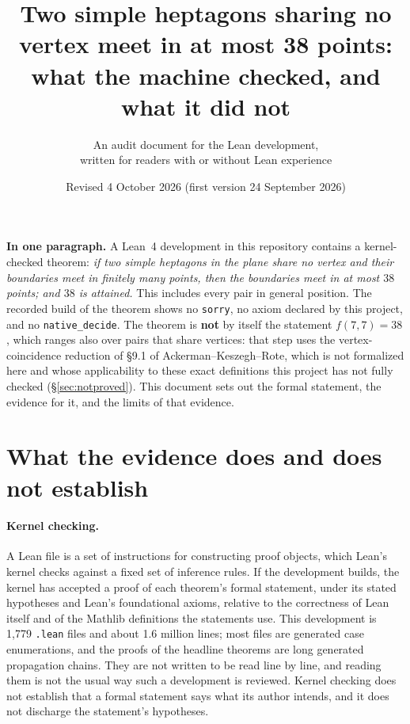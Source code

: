 \documentclass[11pt]{article}
\title{\bfseries Two simple heptagons sharing no vertex meet in at most 38 points:\\
what the machine checked, and what it did not}
\author{An audit document for the Lean development,\\ written for readers with or without Lean experience}
\date{Revised 4 October 2026 (first version 24 September 2026)}
\newcommand{\code}[1]{\texttt{\small #1}}
\newenvironment{trustbox}%
  {\par\medskip\setlength{\fboxsep}{9pt}%
   \begin{lrbox}{\trustboxbuf}%
   \begin{minipage}{\dimexpr\textwidth-2\fboxsep-2\fboxrule\relax}}%
  {\end{minipage}\end{lrbox}%
   \noindent\fcolorbox{black!35}{black!4}{\usebox{\trustboxbuf}}\par\medskip}
\begin{document}
\maketitle
\thispagestyle{empty}

\vspace{-1.2\baselineskip}

\begin{trustbox}
\textbf{In one paragraph.} A Lean~4 development in this repository contains a
kernel-checked theorem: \emph{if two simple heptagons in the plane share no
vertex and their boundaries meet in finitely many points, then the boundaries
meet in at most $38$ points; and $38$ is attained.} This includes every pair in
general position. The recorded build of the theorem shows no \code{sorry}, no
axiom declared by this project, and no \code{native\_decide}. The theorem is
\textbf{not} by itself the statement $f(7,7)=38$, which ranges also over pairs
that share vertices: that step uses the vertex-coincidence reduction of \S9.1
of Ackerman--Keszegh--Rote, which is not formalized here and whose
applicability to these exact definitions this project has not fully checked
(\S\ref{sec:notproved}). This document sets out the formal statement, the
evidence for it, and the limits of that evidence.
\end{trustbox}

\section{What the evidence does and does not establish}

\paragraph{Kernel checking.} A Lean file is a set of instructions for
constructing proof objects, which Lean's kernel checks against a fixed set of
inference rules. If the development builds, the kernel has accepted a proof of
each theorem's formal statement, under its stated hypotheses and Lean's
foundational axioms, relative to the correctness of Lean itself and of the
Mathlib definitions the statements use. This development is 1{,}779
\code{.lean} files and about 1.6 million lines; most files are generated case
enumerations, and the proofs of the headline theorems are long generated
propagation chains. They are not written to be read line by line, and reading
them is not the usual way such a development is reviewed. Kernel checking does
not establish that a formal statement says what its author intends, and it
does not discharge the statement's hypotheses.
\end{document}
